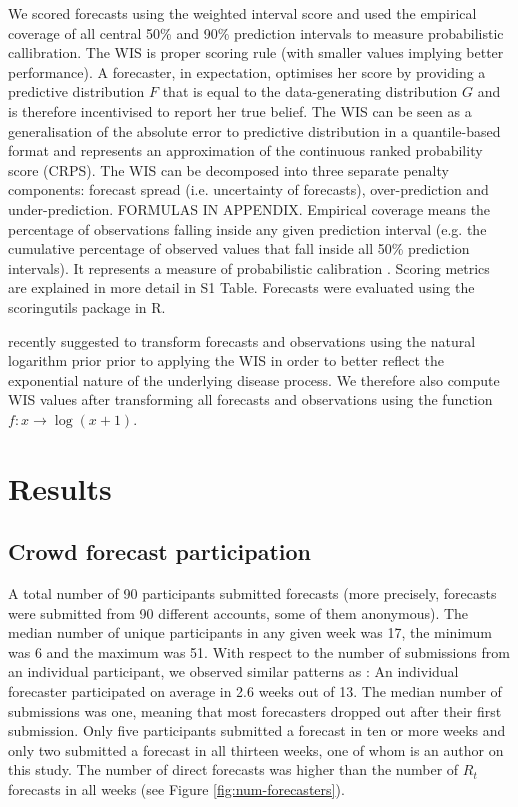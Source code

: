 \documentclass[10pt,a4paper,twocolumn]{article}
\begin{document}
We scored forecasts using the weighted interval score \citep[WIS][]{bracherEvaluatingEpidemicForecasts2021} and used the empirical coverage of all central 50\% and 90\% prediction intervals to measure probabilistic callibration. The WIS is proper scoring rule (with smaller values implying better performance). A forecaster, in expectation, optimises her score by providing a predictive distribution $F$ that is equal to the data-generating distribution $G$ and is therefore incentivised to report her true belief. The WIS can be seen as a generalisation of the absolute error to predictive distribution in a quantile-based format and represents an approximation of the continuous ranked probability score (CRPS). The WIS can be decomposed into three separate penalty components: forecast spread (i.e. uncertainty of forecasts), over-prediction and under-prediction. FORMULAS IN APPENDIX. Empirical coverage means the percentage of observations falling inside any given prediction interval (e.g. the cumulative percentage of observed values that fall inside all 50\% prediction intervals). It represents a measure of probabilistic calibration \citep{gneitingProbabilisticForecastsCalibration2007}. Scoring metrics are explained in more detail in S1 Table. Forecasts were evaluated using the scoringutils \citep{bosseEvaluatingForecastsScoringutils2022} package in R.

\cite{bosseTransformationForecastsEvaluating2023} recently suggested to transform forecasts and observations using the natural logarithm prior prior to applying the WIS in order to better reflect the exponential nature of the underlying disease process. We therefore also compute WIS values after transforming all forecasts and observations using the function $f: x \to \log (x + 1)$. 

\section*{Results}

\subsection*{Crowd forecast participation}

A total number of 90 participants submitted forecasts (more precisely, forecasts were submitted from 90 different accounts, some of them anonymous). The median number of unique participants in any given week was 17, the minimum was 6 and the maximum was 51. With respect to the number of submissions from an individual participant, we observed similar patterns as \cite{bosseComparingHumanModelbased2022}: An individual forecaster participated on average in 2.6 weeks out of 13. The median number of submissions was one, meaning that most forecasters dropped out after their first submission. Only five participants submitted a forecast in ten or more weeks and only two submitted a forecast in all thirteen weeks, one of whom is an author on this study. The number of direct forecasts was higher than the number of $R_t$ forecasts in all weeks (see Figure \ref{fig:num-forecasters}). 
\end{document}
